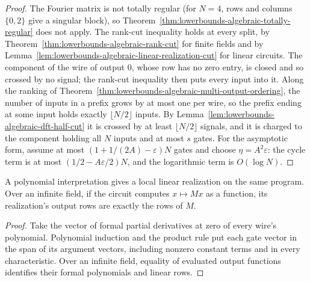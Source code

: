 \begin{proof}
  \leanok
  The Fourier matrix is not totally regular (for $N=4$, rows and columns $\{0,2\}$ give a
  singular block), so Theorem~\ref{thm:lowerbounds-algebraic-totally-regular} does not apply.
  The rank-cut inequality holds at every split, by
  Theorem~\ref{thm:lowerbounds-algebraic-rank-cut} for finite fields and by
  Lemma~\ref{lem:lowerbounds-algebraic-linear-realization-cut} for linear circuits. The
  component of the wire of output $0$, whose row has no zero entry, is closed and so crossed by
  no signal; the rank-cut inequality then puts every input into it. Along the ranking of
  Theorem~\ref{thm:lowerbounds-algebraic-multi-output-ordering}, the number of inputs in a
  prefix grows by at most one per wire, so the prefix ending at some input holds exactly
  $\lfloor N/2\rfloor$ inputs. By Lemma~\ref{lem:lowerbounds-algebraic-dft-half-cut} it is
  crossed by at least $\lfloor N/2\rfloor$ signals, and it is charged to the component holding
  all $N$ inputs and at most $s$ gates. For the asymptotic form, assume at most
  $(1+1/(2A)-\varepsilon)N$ gates and choose $\eta=A^2\varepsilon$: the cycle term is at most
  $(1/2-A\varepsilon/2)N$, and the logarithmic term is $O(\log N)$.
\end{proof}

\begin{lemma}
  \label{lem:lowerbounds-algebraic-polynomial-linearization}
  \leanok
  A polynomial interpretation gives a local linear realization on the same
  program. Over an infinite field, if the circuit computes $x\mapsto Mx$ as
  a function, its realization's output rows are exactly the rows of $M$.
\end{lemma}
\begin{proof}
  \leanok
  Take the vector of formal partial derivatives at zero of every wire's
  polynomial. Polynomial induction and the product rule put each gate vector
  in the span of its argument vectors, including nonzero constant terms and
  in every characteristic. Over an infinite field, equality of evaluated
  output functions identifies their formal polynomials and linear rows.
\end{proof}

